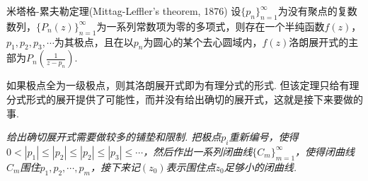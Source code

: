 \begin{theorem}{米塔格-累夫勒定理(Mittag-Leffler's theorem, 1876)}
    设\(\{p_n\}_{n=1}^{\infty}\)为没有聚点的复数数列，\(\{P_n(z)\}_{n=1}^{\infty}\)为一系列常数项为零的多项式，则存在一个半纯函数\(f(z)\)，\(p_1,p_2,p_3,\cdots\)为其极点，且在以\(p_n\)为圆心的某个去心圆域内，\(f(z)\)洛朗展开式的主部为\(\displaystyle{P_n\left(\frac{1}{z-p_n}\right)}\).
\end{theorem}

如果极点全为一级极点，则其洛朗展开式即为有理分式的形式. 但该定理只给有理分式形式的展开提供了可能性，而并没有给出确切的展开式，这就是接下来要做的事.

\vspace{1cm}

\textit{
给出确切展开式需要做较多的铺垫和限制. 把极点\(p_i\)重新编号，使得\(0<|p_1|\leq|p_2|\leq|p_2|\leq|p_3|\leq \cdots\)，然后作出一系列闭曲线\(\{C_m\}_{m=1}^{\infty}\)，使得闭曲线\(C_m\)围住\(p_1, p_2, \cdots, p_m\)，接下来记\((z_0)\)表示围住点\(z_0\)足够小的闭曲线.
}

